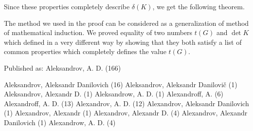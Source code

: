 Since these properties completely describe $\delta(K)$, we get the following theorem.



The method we used in the proof can be considered as a generalization of method of mathematical induction.
We proved equality of two numbers $t(G)$ and $\det K$ which defined in a very different way by showing that they both satisfy a list of common properties which completely defines the value $t(G)$.











Published as: Aleksandrov, A. D. (166)

     Aleksandrov, Aleksandr Danilovich (16)
     Aleksandrov, Aleksandr Danilovič (1)
     Aleksandrov, Alexandr D. (1)
     Aleksandrow, A. D. (1)
     Alexandroff, A. (6)
     Alexandroff, A. D. (13)
     Alexandrov, A. D. (12)
     Alexandrov, Aleksandr Danilovich (1)
     Alexandrov, Alexandr (1)
     Alexandrov, Alexandr D. (4)
     Alexandrov, Alexandr Danilovich (1)
     Alexandrow, A. D. (4)
